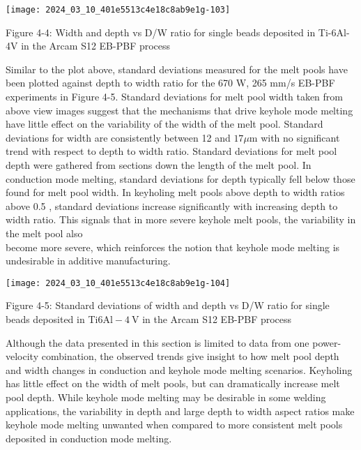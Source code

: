 \documentclass[10pt]{article}
\begin{document}
\begin{center}
\texttt{[image: 2024\_03\_10\_401e5513c4e18c8ab9e1g-103]}
\end{center}

Figure 4-4: Width and depth vs D/W ratio for single beads deposited in Ti-6Al-4V in the Arcam S12 EB-PBF process

Similar to the plot above, standard deviations measured for the melt pools have been plotted against depth to width ratio for the 670 W, 265 mm/s EB-PBF experiments in Figure 4-5. Standard deviations for melt pool width taken from above view images suggest that the mechanisms that drive keyhole mode melting have little effect on the variability of the width of the melt pool. Standard deviations for width are consistently between 12 and $17 \mu \mathrm{m}$ with no significant trend with respect to depth to width ratio. Standard deviations for melt pool depth were gathered from sections down the length of the melt pool. In conduction mode melting, standard deviations for depth typically fell below those found for melt pool width. In keyholing melt pools above depth to width ratios above 0.5 , standard deviations increase significantly with increasing depth to width ratio. This signals that in more severe keyhole melt pools, the variability in the melt pool also\\
become more severe, which reinforces the notion that keyhole mode melting is undesirable in additive manufacturing.

\begin{center}
\texttt{[image: 2024\_03\_10\_401e5513c4e18c8ab9e1g-104]}
\end{center}

Figure 4-5: Standard deviations of width and depth vs D/W ratio for single beads deposited in Ti$6 \mathrm{Al}-4 \mathrm{~V}$ in the Arcam S12 EB-PBF process

Although the data presented in this section is limited to data from one power-velocity combination, the observed trends give insight to how melt pool depth and width changes in conduction and keyhole mode melting scenarios. Keyholing has little effect on the width of melt pools, but can dramatically increase melt pool depth. While keyhole mode melting may be desirable in some welding applications, the variability in depth and large depth to width aspect ratios make keyhole mode melting unwanted when compared to more consistent melt pools deposited in conduction mode melting.
\end{document}
